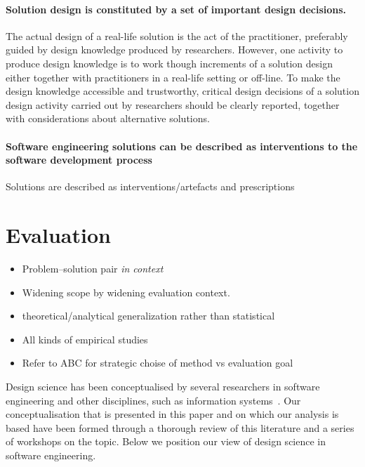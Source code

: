 \documentclass[graybox]{svmult}
\begin{document}
\paragraph{Solution design is constituted by a set of important design decisions.}  The actual design of a real-life solution is the act of the practitioner, preferably guided by design knowledge produced by researchers. However, one activity to produce design knowledge is to work though increments of a solution design either together with practitioners in a real-life setting or off-line. To make the design knowledge accessible and trustworthy, critical design decisions of a solution design activity carried out by researchers should be clearly reported, together with considerations about alternative solutions. 

\paragraph{Software engineering solutions can be described as interventions to the software development process}
Solutions are described as interventions/artefacts and prescriptions



\section{Evaluation}
\begin{itemize}
\item Problem--solution pair \emph{in context}
\item Widening scope by widening evaluation context. 
\item theoretical/analytical generalization rather than statistical 
\item All kinds of empirical studies \cite{easterbrook_selecting_2008}\cite{Runeson12Case,WohlinExpBook12}
\item Refer to ABC \cite{StolABC18} for strategic choise of method vs evaluation goal
\end{itemize}



Design science has been conceptualised by several researchers in software engineering and other disciplines, such as information systems~\cite{gregor_positioning_2013}. Our conceptualisation that is presented in this paper and on which our analysis is based have been formed through a thorough review of this literature and a series of workshops on the topic. Below we position our view of design science in software engineering.
\end{document}
